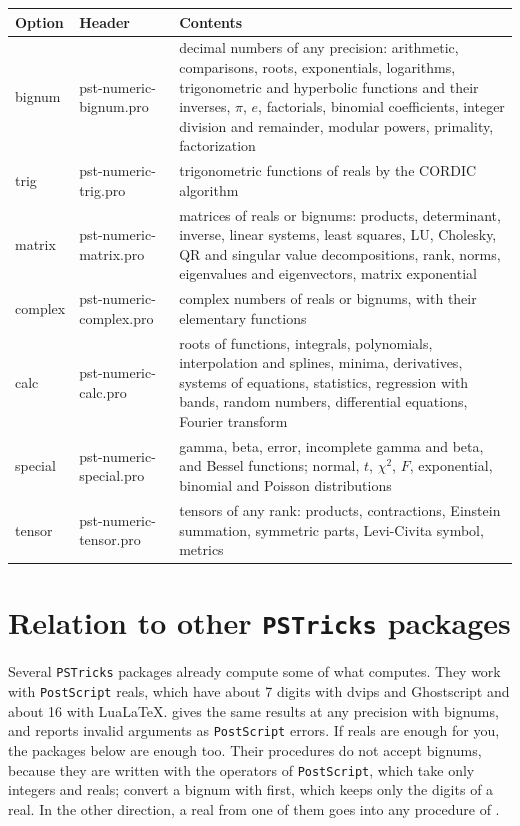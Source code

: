 \documentclass[11pt,english,BCOR=10mm,DIV=12,bibliography=totoc,parskip=false,
   headings=small,headinclude=false,footinclude=false,oneside]{pst-doc}
\DeclareRobustCommand\PS{\texttt{PostScript}\xspace}
\DeclareRobustCommand\PST{\texttt{PSTricks}\xspace}
\newcommand\pkg{\LPack{pst-numeric}}
\begin{document}
\medskip
\noindent\begin{tabularx}{\linewidth}{@{}>{\ttfamily}l>{\ttfamily}lX@{}}\toprule
\textrm{\bfseries Option} & \textrm{\bfseries Header} & \bfseries Contents\\\midrule
bignum  & pst-numeric-bignum.pro  & decimal numbers of any precision: arithmetic,
  comparisons, roots, exponentials, logarithms, trigonometric and hyperbolic
  functions and their inverses, $\pi$, $e$, factorials, binomial
  coefficients, integer division and remainder, modular powers, primality,
  factorization\\
trig    & pst-numeric-trig.pro    & trigonometric functions of reals by the
  CORDIC algorithm\\
matrix  & pst-numeric-matrix.pro  & matrices of reals or bignums: products,
  determinant, inverse, linear systems, least squares, LU, Cholesky, QR and
  singular value decompositions, rank, norms, eigenvalues and eigenvectors,
  matrix exponential\\
complex & pst-numeric-complex.pro & complex numbers of reals or bignums, with
  their elementary functions\\
calc    & pst-numeric-calc.pro    & roots of functions, integrals, polynomials,
  interpolation and splines, minima, derivatives, systems of equations,
  statistics, regression with bands, random numbers, differential
  equations, Fourier transform\\
special & pst-numeric-special.pro & gamma, beta, error, incomplete gamma and
  beta, and Bessel functions; normal, $t$, $\chi^2$, $F$, exponential,
  binomial and Poisson distributions\\
tensor  & pst-numeric-tensor.pro  & tensors of any rank: products,
  contractions, Einstein summation, symmetric parts, Levi-Civita symbol,
  metrics\\\bottomrule
\end{tabularx}


\section{Relation to other \PST{} packages}\label{sec:relation}

Several \PST{} packages already compute some of what \pkg{} computes. They
work with \PS reals, which have about 7 digits with dvips and Ghostscript
and about 16 with Lua\LaTeX. \pkg{} gives the same results at any precision
with bignums, and reports invalid arguments as \PS errors. If reals are
enough for you, the packages below are enough too. Their procedures do not
accept bignums, because they are written with the operators of \PS, which
take only integers and reals; convert a bignum with  first, which
keeps only the digits of a real. In the other direction, a real from one of
them goes into any procedure of \pkg.
\end{document}
